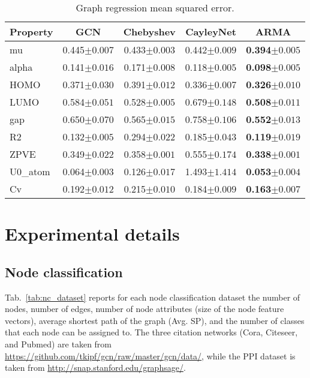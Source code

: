 \documentclass{article}
\begin{document}
\begin{table}
\caption{Graph regression mean squared error. }
\setlength\tabcolsep{.3em} \small
\centering
\bgroup
\def\arraystretch{1.0} \begin{tabular}{lcccc}
\cmidrule[1.5pt]{1-5}
\textbf{Property} & \textbf{GCN} & \textbf{Chebyshev} & \textbf{CayleyNet} & \textbf{ARMA} \\
\midrule
mu       & 0.445\tiny{$\pm0.007$} & 0.433\tiny{$\pm0.003$} & 0.442\tiny{$\pm0.009$} & \textbf{0.394\tiny{$\pm0.005$}} \\
alpha    & 0.141\tiny{$\pm0.016$} & 0.171\tiny{$\pm0.008$} & 0.118\tiny{$\pm0.005$} & \textbf{0.098\tiny{$\pm0.005$}} \\
HOMO     & 0.371\tiny{$\pm0.030$} & 0.391\tiny{$\pm0.012$} & 0.336\tiny{$\pm0.007$} & \textbf{0.326\tiny{$\pm0.010$}} \\
LUMO     & 0.584\tiny{$\pm0.051$} & 0.528\tiny{$\pm0.005$} & 0.679\tiny{$\pm0.148$} & \textbf{0.508\tiny{$\pm0.011$}} \\
gap      & 0.650\tiny{$\pm0.070$} & 0.565\tiny{$\pm0.015$} & 0.758\tiny{$\pm0.106$} & \textbf{0.552\tiny{$\pm0.013$}} \\
R2       & 0.132\tiny{$\pm0.005$} & 0.294\tiny{$\pm0.022$} & 0.185\tiny{$\pm0.043$} & \textbf{0.119\tiny{$\pm0.019$}} \\
ZPVE     & 0.349\tiny{$\pm0.022$} & 0.358\tiny{$\pm0.001$} & 0.555\tiny{$\pm0.174$} & \textbf{0.338\tiny{$\pm0.001$}} \\
U0\_atom & 0.064\tiny{$\pm0.003$} & 0.126\tiny{$\pm0.017$} & 1.493\tiny{$\pm1.414$} & \textbf{0.053\tiny{$\pm0.004$}} \\
Cv       & 0.192\tiny{$\pm0.012$} & 0.215\tiny{$\pm0.010$} & 0.184\tiny{$\pm0.009$} & \textbf{0.163\tiny{$\pm0.007$}} \\
\cmidrule[1.5pt]{1-5}
\end{tabular}
\egroup
\label{tab:gr_res}
\end{table}




\section{Experimental details}
\label{sec:details}

\subsection{Node classification}

Tab.~\ref{tab:nc_dataset} reports for each node classification dataset the number of nodes, number of edges, number of node attributes (size of the node feature vectors), average shortest path of the graph (Avg. SP), and the number of classes that each node can be assigned to.
The three citation networks (Cora, Citeseer, and Pubmed) are taken from \url{https://github.com/tkipf/gcn/raw/master/gcn/data/}, while the PPI dataset is taken from \url{http://snap.stanford.edu/graphsage/}.
\end{document}
